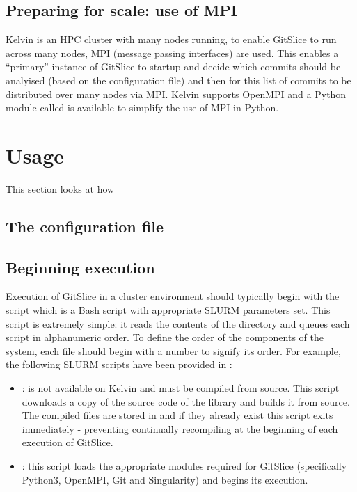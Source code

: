 \documentclass[11pt]{article}
\begin{document}
    \subsection{Preparing for scale: use of MPI}\label{subsec:preparing-for-scale-use-of-mpi}

    Kelvin is an HPC cluster with many nodes running, to enable GitSlice to run across many nodes, MPI (message passing interfaces) are used.
    This enables a ``primary'' instance of GitSlice to startup and decide which commits should be analyised (based on the configuration file) and then for this list of commits to be distributed over many nodes via MPI.
    Kelvin supports OpenMPI and a Python module called  is available to simplify the use of MPI in Python.

    \section{Usage}\label{sec:usage}

    This section looks at how

    \subsection{The configuration file}\label{subsec:the-configuration-file}



    \subsection{Beginning execution}\label{subsec:beginning-execution}

    Execution of GitSlice in a cluster environment should typically begin with the  script which is a Bash script with appropriate SLURM parameters set.
    This script is extremely simple: it reads the contents of the  directory and queues each  script in alphanumeric order.
    To define the order of the components of the system, each  file should begin with a number to signify its order.
    For example, the following SLURM scripts have been provided in \cite{gitlab}:
    
    \begin{itemize}
        \item {}:  is not available on Kelvin and must be compiled from source.  This script downloads a copy of the source code of the library and builds it from source.  The compiled files are stored in  and if they already exist this script exits immediately - preventing continually recompiling at the beginning of each execution of GitSlice.
        \item {}: this script loads the appropriate modules required for GitSlice (specifically Python3, OpenMPI, Git and Singularity) and begins its execution.
    \end{itemize}
\end{document}
